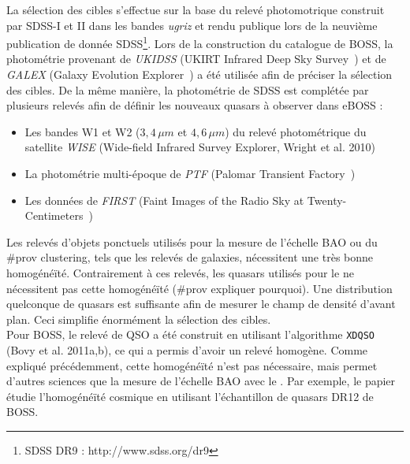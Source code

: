 \documentclass[11pt, twoside, a4paper, openright]{report}
\begin{document}
La sélection des cibles s'effectue sur la base du relevé photomotrique construit par SDSS-I et II dans les bandes \emph{ugriz} et rendu publique lors de la neuvième publication de donnée SDSS\footnote{SDSS DR9 : http://www.sdss.org/dr9}.
Lors de la construction du catalogue de BOSS, la photométrie provenant de \emph{UKIDSS} (UKIRT Infrared Deep Sky Survey~\cite{Lawrence2006}) et de \emph{GALEX} (Galaxy Evolution Explorer~\cite{Martin2004}) a été utilisée afin de préciser la sélection des cibles.
De la même manière, la photométrie de SDSS est complétée par plusieurs relevés afin de définir les nouveaux quasars à observer dans eBOSS :
\begin{itemize}
\item Les bandes W1 et W2 ($3,4\,\mu m$ et $4,6\,\mu m$) du relevé photométrique du satellite \emph{WISE} (Wide-field Infrared Survey Explorer, Wright et al. 2010)
\item La photométrie multi-époque de \emph{PTF} (Palomar Transient Factory~\cite{Law2009})
\item Les données de \emph{FIRST} (Faint Images of the Radio Sky at Twenty-Centimeters~\cite{Becker1995})
\end{itemize}


Les relevés d'objets ponctuels utilisés pour la mesure de l'échelle BAO ou du \#prov clustering, tels que les relevés de galaxies, nécessitent une très bonne homogénéïté. Contrairement à ces relevés, les quasars utilisés pour le \lya ne nécessitent pas cette homogénéïté (\#prov expliquer pourquoi). Une distribution quelconque de quasars est suffisante afin de mesurer le champ de densité d'avant plan. Ceci simplifie énormément la sélection des cibles. \\
Pour BOSS, le relevé de QSO a été construit en utilisant l'algorithme \texttt{XDQSO} (Bovy et al. 2011a,b), ce qui a permis d'avoir un relevé homogène. Comme expliqué précédemment, cette homogénéïté n'est pas nécessaire, mais permet d'autres sciences que la mesure de l'échelle BAO avec le \lya. Par exemple, le papier~\cite{Laurent2016} étudie l'homogénéïté cosmique en utilisant l'échantillon de quasars DR12 de BOSS.
\end{document}
